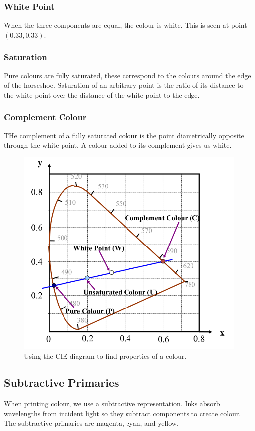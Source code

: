 \documentclass[11pt]{article}
\begin{document}
\subsubsection{White Point}
When the three components are equal, the colour is white.
This is seen at point $(0.33, 0.33)$.

\subsubsection{Saturation}
Pure colours are fully saturated, these correspond to the colours around the edge of the horseshoe.
Saturation of an arbitrary point is the ratio of its distance to the white point over the distance of the white point to the edge.

\subsubsection{Complement Colour}
THe complement of a fully saturated colour is the point diametrically opposite through the white point.
A colour added to its complement gives us white.

\begin{figure}[htb!]
  \centering
  \caption{Using the CIE diagram to find properties of a colour.}
  \includegraphics[scale=0.3]{cie2}
\end{figure}

\subsection{Subtractive Primaries}
When printing colour, we use a subtractive representation.
Inks absorb wavelengths from incident light so they subtract components to create colour.
The subtractive primaries are magenta, cyan, and yellow.
\end{document}
